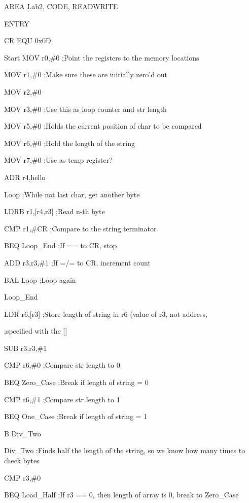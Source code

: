 \documentclass[letterpaper,10pt,titlepage]{article}
\begin{document}
\begin{enumerate}
		AREA Lab2, CODE, READWRITE

		ENTRY
		

CR		EQU 0x0D

	

Start		MOV r0,\#0			;Point the registers to the memory locations

		MOV r1,\#0			;Make sure these are initially zero'd out

		MOV r2,\#0

		MOV r3,\#0			;Use this as loop counter and str length

		MOV r5,\#0			;Holds the current position of char to be compared

		MOV	r6,\#0			;Hold the length of the string

		MOV	r7,\#0			;Use as temp register?

		ADR r4,hello

		

		

Loop			;While not last char, get another byte

		LDRB	        r1,[r4,r3]		;Read n-th byte

		CMP		r1,\#CR		;Compare to the string terminator

		BEQ		Loop\_End		;If == to CR, stop

		ADD		r3,r3,\#1		;If =/= to CR, increment count

		BAL		Loop			;Loop again



Loop\_End	

		LDR	r6,[r3]			;Store length of string in r6 (value of r3, not address,

							;specified with the []

		SUB		r3,r3,\#1

		

		CMP		r6,\#0		;Compare str length to 0

		BEQ		Zero\_Case	;Break if length of string = 0

		CMP		r6,\#1		;Compare str length to 1

		BEQ		One\_Case		;Break if length of string = 1

		B		Div\_Two

		

		

Div\_Two			;Finds half the length of the string, so we know how many times to check bytes

		CMP		r3,\#0

		BEQ		Load\_Half	  	;If r3 == 0, then length of array is 0, break to Zero\_Case


\end{enumerate}
\end{document}
